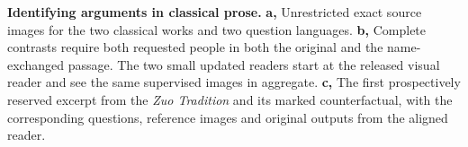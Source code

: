 \textbf{Identifying arguments in classical prose.}
\textbf{a,} Unrestricted exact source images for the two classical works and two question languages. \textbf{b,} Complete contrasts require both requested people in both the original and the name-exchanged passage. The two small updated readers start at the released visual reader and see the same supervised images in aggregate. \textbf{c,} The first prospectively reserved excerpt from the \textit{Zuo Tradition} and its marked counterfactual, with the corresponding questions, reference images and original outputs from the aligned reader.
